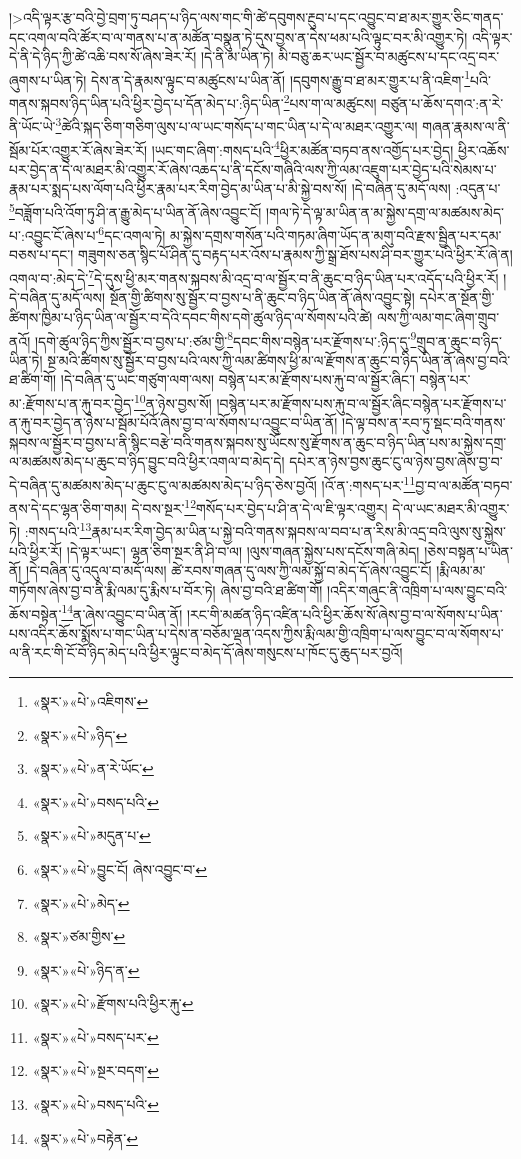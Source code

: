  །>འདི་ལྟར་རྩ་བའི་བྱེ་བྲག་ཏུ་བཤད་པ་ཉིད་ལས་གང་གི་ཚེ་དབུགས་རྔུབ་པ་དང་འབྱུང་བ་ཐ་མར་གྱུར་ཅིང་གནད་དང་འགལ་བའི་ཚོར་བ་ལ་གནས་པ་ན་མཚོན་བསྣུན་ཏེ་དུས་བྱས་ན་དེས་ཕམ་པའི་ལྟུང་བར་མི་འགྱུར་ཏེ། འདི་ལྟར་དེ་ནི་དེ་ཉིད་ཀྱི་ཚེ་འཆི་བས་སོ་ཞེས་ཟེར་རོ། །དེ་ནི་མ་ཡིན་ཏེ། མི་བཅུ་ཆར་ཡང་སྦྱོར་བ་མཚུངས་པ་དང་འདྲ་བར་ཞུགས་པ་ཡིན་ཏེ། དེས་ན་དེ་རྣམས་ལྟུང་བ་མཚུངས་པ་ཡིན་ནོ། །དབུགས་རྒྱུ་བ་ཐ་མར་གྱུར་པ་ནི་འཇིག་\footnote{«སྣར་»«པེ་»འཇིགས་}པའི་གནས་སྐབས་ཉིད་ཡིན་པའི་ཕྱིར་བྱེད་པ་དོན་མེད་པ་:ཉིད་ཡིན་\footnote{«སྣར་»«པེ་»ཉིད་}པས་ག་ལ་མཚུངས། བཙུན་པ་ཆོས་དགའ་:ན་རེ་ནི་ཡོང་ཡེ་\footnote{«སྣར་»«པེ་»ན་རེ་ཡོང་}ཚེའི་སྐད་ཅིག་གཅིག་ལུས་པ་ལ་ཡང་གསོད་པ་གང་ཡིན་པ་དེ་ལ་མཐར་འགྱུར་ལ། གཞན་རྣམས་ལ་ནི་སྦོམ་པོར་འགྱུར་རོ་ཞེས་ཟེར་རོ། །ཡང་གང་ཞིག་:གསད་པའི་\footnote{«སྣར་»«པེ་»བསད་པའི་}ཕྱིར་མཚོན་བཏབ་ནས་འགྱོད་པར་བྱེད། ཕྱིར་འཆོས་པར་བྱེད་ན་དེ་ལ་མཐར་མི་འགྱུར་རོ་ཞེས་འཆད་པ་ནི་དངོས་གཞིའི་ལས་ཀྱི་ལམ་འཇུག་པར་བྱེད་པའི་སེམས་པ་རྣམ་པར་སྨད་པས་ལོག་པའི་ཕྱིར་རྣམ་པར་རིག་བྱེད་མ་ཡིན་པ་མི་སྐྱེ་བས་སོ། །དེ་བཞིན་དུ་མདོ་ལས། :འདུན་པ་\footnote{«སྣར་»«པེ་»མདུན་པ་}བཟློག་པའི་འོག་ཏུ་ཤི་ན་རྒྱུ་མེད་པ་ཡིན་ནོ་ཞེས་འབྱུང་ངོ། །གལ་ཏེ་དེ་ལྟ་མ་ཡིན་ན་མ་སྐྱེས་དགྲ་ལ་མཚམས་མེད་པ་:འབྱུང་ངོ་ཞེས་པ་\footnote{«སྣར་»«པེ་»བྱུང་ངོ། ཞེས་འབྱུང་བ་}དང་འགལ་ཏེ། མ་སྐྱེས་དགྲས་གསོན་པའི་གཏམ་ཞིག་ཡོད་ན་མགུ་བའི་རྫས་སྦྱིན་པར་དམ་བཅས་པ་དང་། གཟུགས་ཅན་སྙིང་པོ་ཤིན་དུ་བརྟད་པར་འོས་པ་རྣམས་ཀྱི་སྒྲ་ཐོས་པས་ཤི་བར་གྱུར་པའི་ཕྱིར་རོ་ཞེ་ན། འགལ་བ་:མེད་དེ་\footnote{«སྣར་»«པེ་»མེད་}དེ་དུས་ཕྱི་མར་གནས་སྐབས་མི་འདྲ་བ་ལ་སྦྱོར་བ་ནི་ཆུང་བ་ཉིད་ཡིན་པར་འདོད་པའི་ཕྱིར་རོ། །དེ་བཞིན་དུ་མདོ་ལས། སྔོན་གྱི་ཚིགས་སུ་སྦྱོར་བ་བྱས་པ་ནི་ཆུང་བ་ཉིད་ཡིན་ནོ་ཞེས་འབྱུང་སྟེ། དཔེར་ན་སྔོན་གྱི་ཚིགས་ཁྱིམ་པ་ཉིད་ཡིན་ལ་སྦྱོར་བ་དེའི་དབང་གིས་དགེ་ཚུལ་ཉིད་ལ་སོགས་པའི་ཚེ། ལས་ཀྱི་ལམ་གང་ཞིག་གྲུབ་ནའོ། །དགེ་ཚུལ་ཉིད་ཀྱིས་སྦྱོར་བ་བྱས་པ་:ཙམ་གྱི་\footnote{«སྣར་»ཙམ་གྱིས་}དབང་གིས་བསྙེན་པར་རྫོགས་པ་:ཉིད་དུ་\footnote{«སྣར་»«པེ་»ཉིད་ན་}གྲུབ་ན་ཆུང་བ་ཉིད་ཡིན་ཏེ། སྔ་མའི་ཚིགས་སུ་སྦྱོར་བ་བྱས་པའི་ལས་ཀྱི་ལམ་ཚིགས་ཕྱི་མ་ལ་རྫོགས་ན་ཆུང་བ་ཉིད་ཡིན་ནོ་ཞེས་བྱ་བའི་ཐ་ཚིག་གོ། །དེ་བཞིན་དུ་ཡང་གཙུག་ལག་ལས། བསྙེན་པར་མ་རྫོགས་པས་རྐུ་བ་ལ་སྦྱོར་ཞིང་། བསྙེན་པར་མ་:རྫོགས་པ་ན་རྐུ་བར་བྱེད་\footnote{«སྣར་»«པེ་»རྫོགས་པའི་ཕྱིར་རྐུ་}ན་ཉེས་བྱས་སོ། །བསྙེན་པར་མ་རྫོགས་པས་རྐུ་བ་ལ་སྦྱོར་ཞིང་བསྙེན་པར་རྫོགས་པ་ན་རྐུ་བར་བྱེད་ན་ཉེས་པ་སྦོམ་པོའོ་ཞེས་བྱ་བ་ལ་སོགས་པ་འབྱུང་བ་ཡིན་ནོ། །དེ་ལྟ་བས་ན་རབ་ཏུ་སྡང་བའི་གནས་སྐབས་ལ་སྦྱོར་བ་བྱས་པ་ནི་སྙིང་བརྩེ་བའི་གནས་སྐབས་སུ་ཡོངས་སུ་རྫོགས་ན་ཆུང་བ་ཉིད་ཡིན་པས་མ་སྐྱེས་དགྲ་ལ་མཚམས་མེད་པ་ཆུང་བ་ཉིད་བྱུང་བའི་ཕྱིར་འགལ་བ་མེད་དེ། དཔེར་ན་ཉེས་བྱས་ཆུང་ངུ་ལ་ཉེས་བྱས་ཞེས་བྱ་བ་དེ་བཞིན་དུ་མཚམས་མེད་པ་ཆུང་ངུ་ལ་མཚམས་མེད་པ་ཉིད་ཅེས་བྱའོ། །འོ་ན་:གསད་པར་\footnote{«སྣར་»«པེ་»བསད་པར་}བྱ་བ་ལ་མཚོན་བཏབ་ནས་དེ་དང་ལྷན་ཅིག་གམ། དེ་བས་སྔར་\footnote{«སྣར་»«པེ་»སྔར་བདག་}གསོད་པར་བྱེད་པ་ཤི་ན་དེ་ལ་ཇི་ལྟར་འགྱུར། དེ་ལ་ཡང་མཐར་མི་འགྱུར་ཏེ། :གསད་པའི་\footnote{«སྣར་»«པེ་»བསད་པའི་}རྣམ་པར་རིག་བྱེད་མ་ཡིན་པ་སྐྱེ་བའི་གནས་སྐབས་ལ་བབ་པ་ན་རིས་མི་འདྲ་བའི་ལུས་སུ་སྐྱེས་པའི་ཕྱིར་རོ། །དེ་ལྟར་ཡང་། ལྷན་ཅིག་སྔར་ནི་ཤི་བ་ལ། །ལུས་གཞན་སྐྱེས་པས་དངོས་གཞི་མེད། །ཅེས་བསྟན་པ་ཡིན་ནོ། །དེ་བཞིན་དུ་འདུལ་བ་མདོ་ལས། ཚེ་རབས་གཞན་དུ་ལས་ཀྱི་ལམ་སྐྱོ་བ་མེད་དོ་ཞེས་འབྱུང་ངོ། །རྨི་ལམ་མ་གཏོགས་ཞེས་བྱ་བ་ནི་རྨི་ལམ་དུ་རྨིས་པ་བོར་ཏེ། ཞེས་བྱ་བའི་ཐ་ཚིག་གོ། །འདིར་གཞུང་ནི་འཁྲིག་པ་ལས་བྱུང་བའི་ཆོས་བསྟེན་\footnote{«སྣར་»«པེ་»བརྟེན་}ན་ཞེས་འབྱུང་བ་ཡིན་ནོ། །རང་གི་མཚན་ཉིད་འཛིན་པའི་ཕྱིར་ཆོས་སོ་ཞེས་བྱ་བ་ལ་སོགས་པ་ཡིན་པས་འདིར་ཆོས་སྨོས་པ་གང་ཡིན་པ་དེས་ན་བཅོམ་ལྡན་འདས་ཀྱིས་རྨི་ལམ་གྱི་འཁྲིག་པ་ལས་བྱུང་བ་ལ་སོགས་པ་ལ་ནི་རང་གི་ངོ་བོ་ཉིད་མེད་པའི་ཕྱིར་ལྟུང་བ་མེད་དོ་ཞེས་གསུངས་པ་ཁོང་དུ་ཆུད་པར་བྱའོ། 
